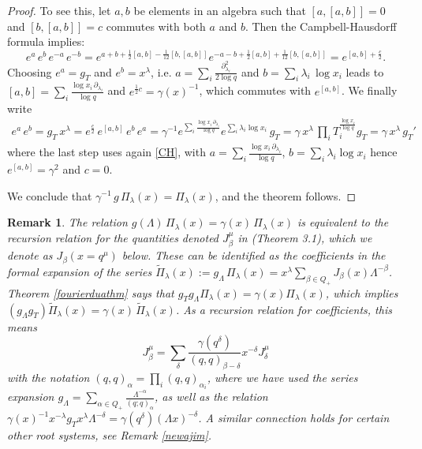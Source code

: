 \documentclass[12pt]{amsart}
\newtheorem{remark}[thm]{Remark}
\newcommand{\al}{{\alpha}}
\numberwithin{equation}{section}
\begin{document}
\begin{proof}
To see this, let $a,b$ be elements in an algebra such that $[a,[a,b]]=0$ and $[b,[a,b]]=c$ commutes with both $a$ and $b$. 
Then the Campbell-Hausdorff formula
implies:
\begin{equation}\label{CH}
e^a\, e^b \,e^{-a} \,e^{-b} = e^{a+b+\frac12[a,b] - \frac{1}{12}[b,[a,b]]}e^{-a-b+\frac12[a,b]+ \frac{1}{12}[b,[a,b]]} 
= e^{[a,b] +\frac{c}{2}}.
\end{equation}
Choosing $e^a=g_T$ and $e^b = x^\lambda$, i.e. $a=\sum_i\frac{\partial_{\lambda_i}^2}{2\log q }$ and $b=\sum_i\lambda_i\,\log x_i$ leads to 
$[a,b]
= \sum_i \frac{\log x_i\,\partial_{\lambda_i}}{\log q}$ and $e^{\frac12 c} = \gamma(x)^{-1}$, which commutes with $e^{[a,b]}$. 
%
We finally write
\begin{eqnarray*} e^a \,e^b= g_T\, x^\lambda=e^{\frac{c}{2}}\, e^{[a,b]} \,e^b\,e^a
=\gamma^{-1} e^{\sum_i \frac{\log x_i\,\partial_{\lambda_i}}{\log q}} e^{\sum_i \lambda_i \log x_i}\, g_T
=\gamma \, x^\lambda\, \prod_i T_i^{\frac{\log x_i}{\log q}} g_T=\gamma \, x^\lambda\,g_T'
\end{eqnarray*}
where the last step uses again \eqref{CH}, with $a=\sum_i \frac{\log x_i\,\partial_{\lambda_i}}{\log q}$, $b=\sum_i \lambda_i \log x_i$
hence $e^{[a,b]}=\gamma^2$ and $c=0$.

We conclude that $\gamma^{-1} \,g\, \Pi_\lambda(x)=\Pi_\lambda(x)$, and the theorem follows.
\end{proof}

\begin{remark} \label{ajim}
The relation $g(\Lambda)\, \Pi_\lambda(x) = \gamma(x) \, \Pi_\lambda(x)$ is equivalent to the recursion relation for 
the quantities denoted $J_\beta^\mu$ in \cite{FJMMfermio} (Theorem 3.1), which we denote as $J_\beta(x=q^\mu)$ below. These can be identified as the coefficients in the formal expansion of the series
$\widetilde \Pi_\lambda(x):=g_\Lambda\,\Pi_\lambda(x)=x^\lambda \sum_{\beta \in Q_+}  J_\beta(x)\Lambda^{-\beta}$.
Theorem \ref{fourierduathm} says that $g_Tg_\Lambda \Pi_\lambda(x)=\gamma(x)\Pi_\lambda(x)$, which implies
$(g_\Lambda g_T) \widetilde \Pi_\lambda(x)=\gamma(x)\, \widetilde \Pi_\lambda(x)$. As a recursion relation for coefficients, this means
$$J_\beta^\mu=\sum_\delta \frac{\gamma(q^\delta)}{(q,q)_{\beta-\delta}} x^{-\delta}J_\delta^\mu$$
with the notation $(q,q)_\al=\prod_i (q,q)_{\al_i}$,  
where we have used the series expansion $g_\Lambda=\sum_{\alpha\in Q_+} \frac{\Lambda^{-\alpha}}{(q;q)_\alpha}$,
as well as the relation $\gamma(x)^{-1} x^{-\lambda}g_T x^\lambda \Lambda^{-\delta}=\gamma(q^{\delta})(\Lambda x)^{-\delta}$.
A similar connection holds for certain other root systems, see Remark \ref{newajim}.
\end{remark}
\end{document}
